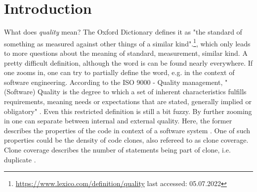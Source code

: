 
\section{Introduction}
\label{sec:intro}

What does \textit{quality} mean? The Oxford Dictionary defines it as "the standard of something as measured against other things of a similar kind".\footnote{\url{https://www.lexico.com/definition/quality} last accessed: 05.07.2022}, which only leads to more questions about the meaning of standard, measurement, similar kind. A pretty difficult definition, although the word is can be found nearly everywhere.
If one zooms in, one can try to partially define the word, e.g. in the context of software engineering. According to the ISO 9000 - Quality management, "(Software) Quality is the degree to which a set of inherent characteristics fulfills requirements, meaning needs or expectations that are stated, generally implied or obligatory" \cite{matthes2020ase}.
Even this restricted definition is still a bit fuzzy. By further zooming in one can separate between internal and external quality. Here, the former describes the properties of the code in context of a software system \cite{pretschner2022requirements}.
One of such properties could be the density of code clones, also refereed to as clone coverage. Clone coverage describes the number of statements being part of clone, i.e. duplicate \cite{knilling2020priorisierung}.
